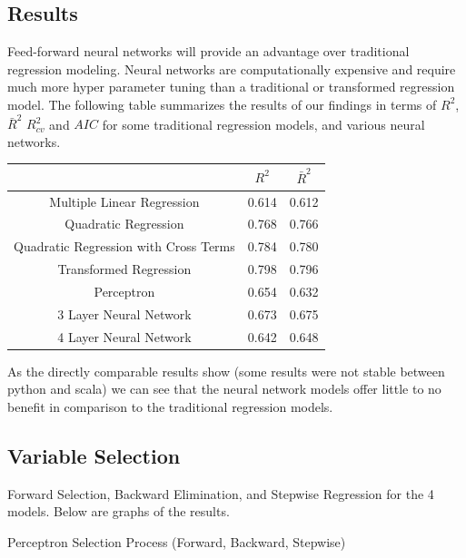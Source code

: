 \documentclass{article}
\begin{document}
	\subsection{Results}

	Feed-forward neural networks will provide an advantage over 
	traditional regression modeling. Neural networks 
	are computationally expensive and require much more hyper parameter tuning than a traditional or 
	transformed regression model. The following table summarizes the results of our findings in terms 
	of $R^2$, $\bar R^2$ $R^2_{cv}$ and $AIC$ for some traditional regression models, and various neural networks. 
	

	\begin{tabular}{|c|c|c|}
		\hline
		& $R^2$ & $\bar R^2$ \\ \hline
		Multiple Linear Regression            & 0.614 & 0.612      \\ \hline
		Quadratic Regression                  & 0.768 & 0.766      \\ \hline
		Quadratic Regression with Cross Terms & 0.784 & 0.780      \\ \hline
		Transformed Regression                & 0.798 & 0.796      \\ \hline
		Perceptron                            & 0.654 & 0.632     \\ \hline
		3 Layer Neural Network                & 0.673 & 0.675      \\ \hline
		4 Layer Neural Network                & 0.642 & 0.648     \\ \hline
	\end{tabular}

	As the directly comparable results show (some results were not stable between python and scala) we can see that the neural 
	network models offer little to no benefit in comparison to the traditional regression models.
	
	\subsection{Variable Selection}
	
	Forward Selection, Backward Elimination, and Stepwise Regression for the 4 models. Below are graphs of the results.
	
	Perceptron Selection Process (Forward, Backward, Stepwise)
	
\end{document}

